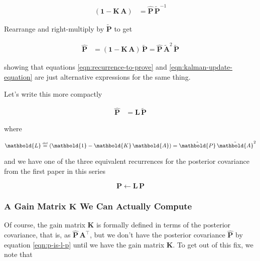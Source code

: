 \documentclass[10pt,oneside,x11names]{article}
\begin{document}
\begin{align*}
(\mathbold{1}-\mathbold{K}\,\mathbold{A})
&=
{\hat{\mathbold{P}}}\,
\tilde{\mathbold{P}}^{-1}
\end{align*}

\noindent Rearrange and right-multiply by \(\tilde{\mathbold{P}}\) to get

\begin{align}
\label{eqn:p-is-l-p}
\hat{\mathbold{P}}
&=\left(
\mathbold{1}-
\mathbold{K}\,
\mathbold{A}
\right)\,
\tilde{\mathbold{P}}
=
\hat{\mathbold{P}}\,{\tilde{\mathbold{A}}}^2\,\tilde{\mathbold{P}}
\end{align}

\noindent showing that equations \ref{eqn:recurrence-to-prove} and
\ref{eqn:kalman-update-equation} are just alternative expressions for the same
thing.


Let's write this more compactly

\begin{align}
\label{eqn:derivation-of-p-is-l-p}
{\hat{\mathbold{P}}} &=
\mathbold{L}\,
{\tilde{\mathbold{P}}}
\end{align}

\noindent where

\begin{equation}
\label{eqn:definition-of-l}
\mathbold{L}\stackrel{\text{\tiny def}}{=}
(\mathbold{1}-
\mathbold{K}\,
\mathbold{A})
=
\hat{\mathbold{P}}\,{\tilde{\mathbold{A}}}^2
\end{equation}

\noindent and we have
one of the three equivalent recurrences
for the posterior covariance
from the first paper in this series

\begin{equation}
{{\mathbold{P}}} \leftarrow
\mathbold{L}\,
{{\mathbold{P}}}
\end{equation}

\subsubsection{A Gain Matrix \(\mathbold{K}\) We Can Actually Compute}
\label{sec:orgheadline13}



Of course, the gain matrix \(\mathbold{K}\) is formally defined in terms of the
posterior covariance, that is, as \(\hat{\mathbold{P}}\,\mathbold{A}^\intercal\),
but we don't have the posterior covariance \(\hat{\mathbold{P}}\) by equation
\ref{eqn:p-is-l-p} until we have the gain matrix \(\mathbold{K}\). To get out of
this fix, we note that 
\end{document}
